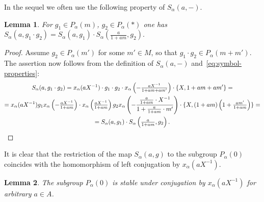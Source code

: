 \documentclass[oneside, 8pt]{amsart}
\newtheorem{lemma}{Lemma}
\theoremstyle{remark}
\theoremstyle{definition}
\numberwithin{lemma}{section}
\numberwithin{prop}{section}
\numberwithin{corollary}{section}
\numberwithin{externaltheorem}{section}
\numberwithin{equation}{section}
\begin{document}
In the sequel we often use the following property of $S_\alpha(a, -)$.
\begin{lemma} \label{lem:Smult}
For $g_1 \in P_\alpha(m)$, $g_2 \in P_\alpha(*)$ one has
$S_\alpha(a, g_1\cdot g_2) = S_\alpha(a, g_1) \cdot S_\alpha\left(\tfrac{a}{1+am}, g_2\right).$
\end{lemma} \begin{proof} Assume $g_2\in P_\alpha(m')$ for some $m' \in M$, so that $g_1 \cdot g_2 \in P_\alpha(m + m')$. The assertion now follows from the definition of $S_\alpha(a, -)$ and~\eqref{eq:symbol-properties}:
\begin{multline*} S_\alpha(a, g_1 \cdot g_2) = x_\alpha(aX^{-1}) \cdot g_1 \cdot g_2 \cdot x_\alpha\left(-\tfrac{aX^{-1}}{1+am+am'}\right) \cdot \{X, 1 + am + am'\} = \\ = x_\alpha(aX^{-1}) g_1  x_\alpha\left(-\tfrac{aX^{-1}}{1+am}\right) \cdot x_\alpha\left(\tfrac{aX^{-1}}{1+am}\right) g_2 x_\alpha\left(-\frac{\tfrac{a}{1+am}\cdot X^{-1}}{1 + \tfrac{a}{1+am}\cdot m'}\right) \cdot \{X, (1+am)\left(1 + \tfrac{am'}{1+am}\right)\} = \\ = S_\alpha(a, g_1) \cdot S_\alpha\left(\tfrac{a}{1+am}, g_2\right). \qedhere \end{multline*}
\end{proof}
It is clear that the restriction of the map $S_\alpha(a, g)$ to the subgroup $P_\alpha(0)$ coincides with the homomorphism of left conjugation by $x_\alpha(aX^{-1})$.
\begin{lemma}\label{P0_conj} The subgroup $P_\alpha(0)$ is stable under conjugation by $x_\alpha(aX^{-1})$ for arbitrary $a\in A$. \end{lemma}
\end{document}
